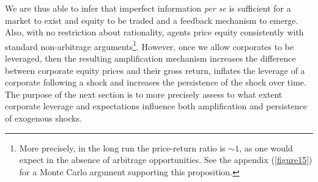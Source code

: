 \documentclass[11pt]{article}
\begin{document}
We are thus able to infer that imperfect information \emph{per se} is sufficient for a market to exist and equity to be traded and a feedback mechanism to emerge. Also, with no restriction about rationality, agents price equity consistently with standard non-arbitrage arguments\footnote{More precisely, in the long run the price-return ratio is $\sim 1$, as one would expect in the absence of arbitrage opportunities. See the appendix (\ref{figure15}) for a Monte Carlo argument supporting this proposition.}. However, once we allow corporates to be leveraged, then the resulting amplification mechanism increases the difference between corporate equity prices and their gross return, inflates the leverage of a corporate following a shock and increases the persistence of the shock over time. The purpose of the next section is to more precisely assess to what extent corporate leverage and expectations influence both amplification and persistence of exogenous shocks.
\end{document}
